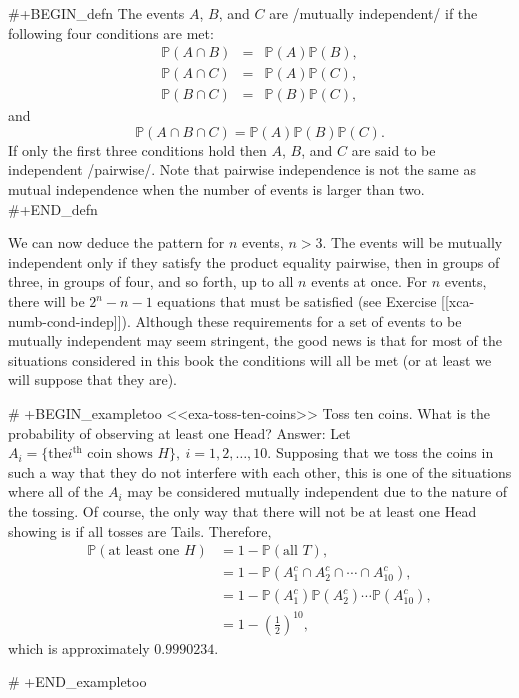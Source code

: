 #+BEGIN_defn
The events \(A\), \(B\), and \(C\) are /mutually independent/ if the
following four conditions are met:
\begin{eqnarray*}
\mathbb{P}(A\cap B) & = & \mathbb{P}(A)\mathbb{P}(B),\\
\mathbb{P}(A\cap C) & = & \mathbb{P}(A)\mathbb{P}(C),\\
\mathbb{P}(B\cap C) & = & \mathbb{P}(B)\mathbb{P}(C),
\end{eqnarray*}
and
\[
\mathbb{P}(A\cap B\cap C)=\mathbb{P}(A)\mathbb{P}(B)\mathbb{P}(C).
\]
If only the first three conditions hold then \(A\), \(B\), and \(C\)
are said to be independent /pairwise/. Note that pairwise independence
is not the same as mutual independence when the number of events is
larger than two.
#+END_defn

We can now deduce the pattern for \(n\) events, \(n>3\). The events
will be mutually independent only if they satisfy the product equality
pairwise, then in groups of three, in groups of four, and so forth, up
to all \(n\) events at once. For \(n\) events, there will be
\(2^{n}-n-1\) equations that must be satisfied (see Exercise [[xca-numb-cond-indep]]). Although these requirements for a set of events to
be mutually independent may seem stringent, the good news is that for
most of the situations considered in this book the conditions will all
be met (or at least we will suppose that they are).

# +BEGIN_exampletoo
<<exa-toss-ten-coins>> Toss ten coins. What is the probability of
observing at least one Head? Answer: Let \(A_{i}= \{ \mbox{the
}i^{\mathrm{th}}\mbox{ coin shows }H \} ,\
i=1,2,\ldots,10\). Supposing that we toss the coins in such a way that
they do not interfere with each other, this is one of the situations
where all of the \(A_{i}\) may be considered mutually independent due
to the nature of the tossing. Of course, the only way that there will
not be at least one Head showing is if all tosses are
Tails. Therefore,
\begin{align*}
\mathbb{P}(\mbox{at least one }H) & =1-\mathbb{P}(\mbox{all }T),\\
 & =1-\mathbb{P}(A_{1}^{c}\cap A_{2}^{c}\cap\cdots\cap A_{10}^{c}),\\
 & =1-\mathbb{P}(A_{1}^{c})\mathbb{P}(A_{2}^{c})\cdots\mathbb{P}(A_{10}^{c}),\\
 & =1-\left(\frac{1}{2}\right)^{10},
\end{align*}
which is approximately \(0.9990234\).

# +END_exampletoo

